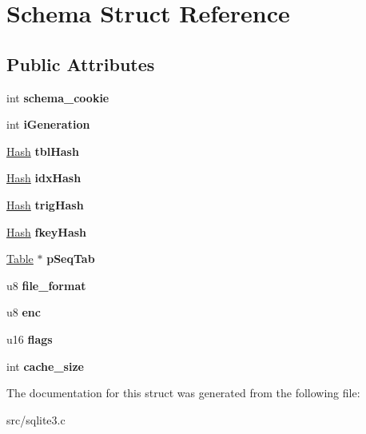 \hypertarget{struct_schema}{\section{Schema Struct Reference}
\label{struct_schema}
}
\subsection*{Public Attributes}
\begin{DoxyCompactItemize}
\item 
\hypertarget{struct_schema_a3eef54a64f4f962d64577646bd34a47c}{int {\bfseries schema\-\_\-cookie}}\label{struct_schema_a3eef54a64f4f962d64577646bd34a47c}

\item 
\hypertarget{struct_schema_a879b1597656c7cbcbb98cdb88e876874}{int {\bfseries i\-Generation}}\label{struct_schema_a879b1597656c7cbcbb98cdb88e876874}

\item 
\hypertarget{struct_schema_af841eadc93b289944b95f72b784bfaae}{\hyperlink{struct_hash}{Hash} {\bfseries tbl\-Hash}}\label{struct_schema_af841eadc93b289944b95f72b784bfaae}

\item 
\hypertarget{struct_schema_ac0dd242f486d17ddadca1e47af76c6c5}{\hyperlink{struct_hash}{Hash} {\bfseries idx\-Hash}}\label{struct_schema_ac0dd242f486d17ddadca1e47af76c6c5}

\item 
\hypertarget{struct_schema_ab521f4545d200329d8e1a46bbb67e7c5}{\hyperlink{struct_hash}{Hash} {\bfseries trig\-Hash}}\label{struct_schema_ab521f4545d200329d8e1a46bbb67e7c5}

\item 
\hypertarget{struct_schema_ad51ed96351701cfe8d9e871722827c11}{\hyperlink{struct_hash}{Hash} {\bfseries fkey\-Hash}}\label{struct_schema_ad51ed96351701cfe8d9e871722827c11}

\item 
\hypertarget{struct_schema_ad580e4e662724bee95571d297f94da37}{\hyperlink{struct_table}{Table} $\ast$ {\bfseries p\-Seq\-Tab}}\label{struct_schema_ad580e4e662724bee95571d297f94da37}

\item 
\hypertarget{struct_schema_ab9f0371436e41b3080772995407a4cca}{u8 {\bfseries file\-\_\-format}}\label{struct_schema_ab9f0371436e41b3080772995407a4cca}

\item 
\hypertarget{struct_schema_a1338d09fe9cbb5a8162929202cb73cae}{u8 {\bfseries enc}}\label{struct_schema_a1338d09fe9cbb5a8162929202cb73cae}

\item 
\hypertarget{struct_schema_a14838766a0a438e590a27f300beff459}{u16 {\bfseries flags}}\label{struct_schema_a14838766a0a438e590a27f300beff459}

\item 
\hypertarget{struct_schema_a0a66691be95a30c099ca4840da7110dd}{int {\bfseries cache\-\_\-size}}\label{struct_schema_a0a66691be95a30c099ca4840da7110dd}

\end{DoxyCompactItemize}


The documentation for this struct was generated from the following file\-:\begin{DoxyCompactItemize}
\item 
src/sqlite3.\-c\end{DoxyCompactItemize}
